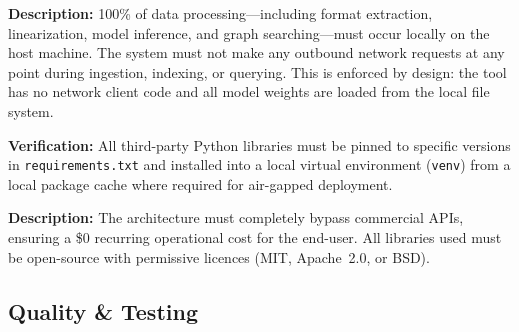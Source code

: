 \documentclass[12pt, a4paper]{article}
\begin{document}
\begin{tcolorbox}[enhanced, colback=white, colframe=ctGold,
    colbacktitle=ctLightGold, coltitle=ctPurple, boxrule=0.5pt,
    leftrule=4pt, arc=2mm, fonttitle=\large\bfseries,
    title={NFR-3: Absolute Privacy (Air-Gapped Operation)},
    drop fuzzy shadow=black!5!white]
\begin{prolist}
    \item \textbf{Description:} 100\% of data processing---including format
    extraction, linearization, model inference, and graph searching---must
    occur locally on the host machine. The system must not make any outbound
    network requests at any point during ingestion, indexing, or querying.
    This is enforced by design: the tool has no network client code and all
    model weights are loaded from the local file system.

    \item \textbf{Verification:} All third-party Python libraries must be
    pinned to specific versions in \texttt{requirements.txt} and installed
    into a local virtual environment (\texttt{venv}) from a local package
    cache where required for air-gapped deployment.
\end{prolist}
\end{tcolorbox}

\begin{tcolorbox}[enhanced, colback=white, colframe=ctGold,
    colbacktitle=ctLightGold, coltitle=ctPurple, boxrule=0.5pt,
    leftrule=4pt, arc=2mm, fonttitle=\large\bfseries,
    title={NFR-4: Zero Operational Cost},
    drop fuzzy shadow=black!5!white]
\begin{prolist}
    \item \textbf{Description:} The architecture must completely bypass
    commercial APIs, ensuring a \$0 recurring operational cost for the
    end-user. All libraries used must be open-source with permissive
    licences (MIT, Apache~2.0, or BSD).
\end{prolist}
\end{tcolorbox}

\subsection{Quality \& Testing}
\end{document}
